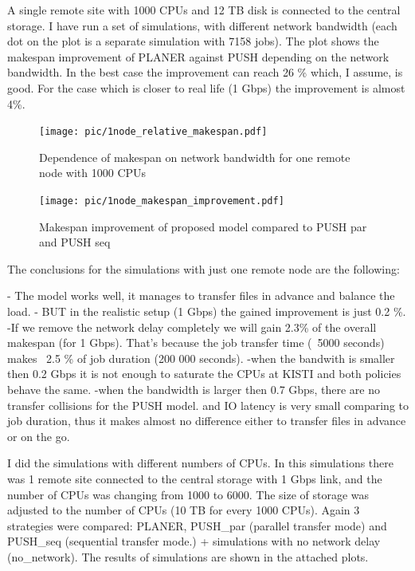 \documentclass{svjour3}                     %
\begin{document}
A single remote site with 1000 CPUs and 12 TB disk is connected to the central storage. I have run a set of simulations, with different network bandwidth (each dot on the plot is a separate simulation with 7158 jobs). The plot shows the makespan improvement of PLANER against PUSH depending on the network bandwidth. In the best case the improvement can reach 26 \% which, I assume, is good. For the case which is closer to real life (1 Gbps) the improvement is almost 4\%.

\begin{figure}[h]
\begin{minipage}{.49\textwidth}
\centering
    \texttt{[image: pic/1node\_relative\_makespan.pdf]}

    \caption{Dependence of makespan on network bandwidth for one remote node with 1000 CPUs}
    \label{fig:simulated grig}
\end{minipage}\hspace{1pc}%
\begin{minipage}{.49\textwidth}
\centering
    \texttt{[image: pic/1node\_makespan\_improvement.pdf]}
    \caption{Makespan improvement of proposed model compared to PUSH par and PUSH seq}
    \label{fig:path}
\end{minipage} 
\end{figure}
The conclusions for the simulations with just one remote node are the following:

- The model works well, it manages to transfer files in advance and balance the load.
- BUT in the realistic setup (1 Gbps) the gained improvement is just 0.2 \%. 
-If we remove the network delay completely we will gain 2.3\% of the overall makespan (for 1 Gbps). That's because the job transfer time (~5000 seconds) makes ~2.5 \% of job duration (200 000 seconds).
-when the bandwith is smaller then 0.2 Gbps it is not enough to saturate the CPUs at KISTI and both policies behave the same.
-when the bandwidth is larger then 0.7 Gbps, there are no transfer collisions for the PUSH model. and IO latency is very small comparing to job duration, thus it makes almost no difference either to transfer files in advance or on the go. 


I did the simulations with different numbers of CPUs. In this simulations there was 1 remote site connected to the central storage with 1 Gbps link, and the number of CPUs was changing from 1000 to 6000. The size of storage was adjusted to the number of CPUs (10 TB for every 1000 CPUs).
Again 3 strategies were compared:  PLANER, PUSH\_par (parallel transfer mode) and PUSH\_seq (sequential transfer mode.) + simulations with no network delay (no\_network). 
The results of simulations are shown in the attached plots. 
\end{document}
